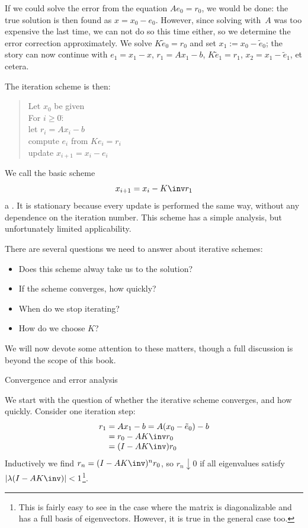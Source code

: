 If we could solve the error from the equation $Ae_0=r_0$, we would be
done: the true solution is then found as $x=x_0-e_0$. However,
since solving with~$A$ was
too expensive the last time, we can not do so this time either, so we
determine the error correction approximately.
We solve $K\tilde e_0=r_0$ and set $x_1:=x_0-\tilde e_0$; the story can now
continue with $e_1=x_1-x$, $r_1=Ax_1-b$, $K\tilde e_1=r_1$,
$x_2=x_1-\tilde e_1$, et cetera.

The iteration scheme is then:
  \begin{quote}
\begin{tabbing}
  Let $x_0$ be given\\
  For $i\geq0$\=:\\
  \>let $r_i=Ax_i-b$\\
  \>compute $e_i$ from $Ke_i=r_i$\\
  \>update $x_{i+1}=x_i-e_i$
\end{tabbing}
  \end{quote}
We call the basic scheme
\begin{equation}
  x_{i+1}=x_i-K\inv r_1
  \label{eq:stat-it}
\end{equation}
a . It is stationary
because every update is performed the same way, without any dependence
on the iteration number. This scheme has a simple analysis, but
unfortunately limited applicability.

There are several questions we need to answer about iterative schemes:
\begin{itemize}
\item Does this scheme alway take us to the solution?
\item If the scheme converges, how quickly?
\item When do we stop iterating?
\item How do we choose $K$?
\end{itemize}
We will now devote some attention to these matters, though a full
discussion is beyond the scope of this book.

 {Convergence and error analysis}
\label{sec:stationary-convergence}

We start with the question of whether the iterative scheme converges,
and how quickly. Consider one iteration step:
\begin{equation}
  \begin{array}{r@{{}={}}l}
    r_1&Ax_1-b=A(x_0-\tilde e_0)-b\\
    &r_0-AK\inv r_0\\
    &(I-AK\inv)r_0
  \end{array}
\end{equation}
Inductively we find $r_n=(I-AK\inv)^nr_0$, so $r_n\downarrow0$ if
  all eigenvalues satisfy $|\lambda(I-AK\inv)|<1$\footnote
  {This is fairly easy to see in the case where the matrix is diagonalizable
  and has a full basis of eigenvectors. However, it is true in the general case too.}.

